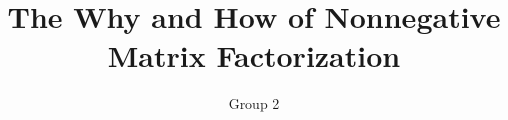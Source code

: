 \documentclass[final]{beamer}
\title{The Why and How of Nonnegative Matrix Factorization} %
\author{Group 2} %
\institute{École Polytechnique de Louvain, UCLouvain} %
\newlength{\sepwid}
\newlength{\onecolwid}
\newlength{\threecolwid}
\begin{document}

\setlength{\belowcaptionskip}{2ex} %
\setlength\belowdisplayshortskip{2ex} %
\begin{frame} %


  \begin{columns}
   \begin{column}{\linewidth}
    \vskip0.5cm
    \centering
   \end{column}
  \end{columns}


\begin{columns}[t] %
\begin{column}{\sepwid}
\end{column} %
\begin{column}{\threecolwid}
\begin{columns}[t]

\begin{column}{\onecolwid} %



\end{column}
\end{columns}
\end{column}
\end{columns}
\end{frame}
\end{document}
